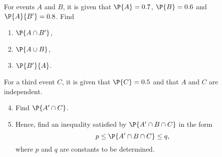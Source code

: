 \begin{problem}
    For events $A$ and $B$, it is given that $\P{A} = 0.7$, $\P{B} = 0.6$ and $\P{A}{B'} = 0.8$. Find
    \begin{enumerate}
        \item $\P{A \cap B'}$,
        \item $\P{A \cup B}$,
        \item $\P{B'}{A}$.
    \end{enumerate}
    For a third event $C$, it is given that $\P{C} = 0.5$ and that $A$ and $C$ are independent.
    \begin{enumerate}
        \setcounter{enumi}{3}
        \item Find $\P{A' \cap C}$.
        \item Hence, find an inequality satisfied by $\P{A' \cap B \cap C}$ in the form \[p \leq \P{A' \cap B \cap C} \leq q,\] where $p$ and $q$ are constants to be determined.
    \end{enumerate}
\end{problem}
\clearpage
